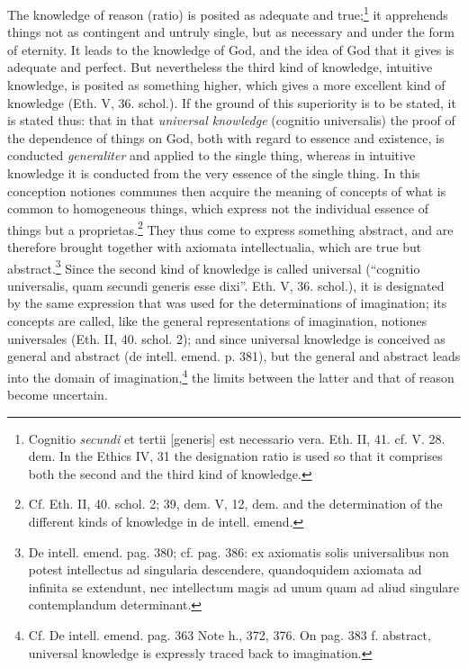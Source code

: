 \documentclass[12pt,a4paper,openany]{book}
\newcommand{\opage}[1]{\marginnote{\footnotesize\textit{[#1]}}}
\begin{document}
The knowledge of reason (ratio) is posited as adequate and
true;\footnote{Cognitio \emph{secundi} et tertii [generis] est
necessario vera. Eth. II, 41. cf. V. 28. dem. In the Ethics IV, 31
the designation ratio is used so that it comprises both the second
and the third kind of knowledge.} it apprehends things not as contingent
and untruly single, but as necessary and under the form of eternity. It
leads to the knowledge of God, and the idea of God that it gives is adequate and
perfect. But nevertheless the third
\opage{101}\setcounter{footnote}{0}kind of knowledge, intuitive knowledge, is posited as something higher, which
gives a more excellent kind of knowledge (Eth. V, 36. schol.). If
the ground of this superiority is to be stated, it is stated thus: that in
that \emph{universal knowledge} (cognitio universalis) the proof of
the dependence of things on God, both with regard to essence and
existence, is conducted \emph{generaliter} and applied to the single
thing, whereas in intuitive knowledge it is conducted from the very
essence of the single thing. In this conception notiones communes then acquire
the meaning of concepts of what is common to homogeneous things, which
express not the individual essence of things but a
proprietas.\footnote{Cf. Eth. II, 40. schol. 2; 39, dem. V, 12,
dem. and the determination of the different kinds of knowledge in de
intell. emend.} They thus come to express something abstract, and
are therefore brought together with axiomata intellectualia, which are true
but abstract.\footnote{De intell. emend. pag. 380; cf. pag. 386:
ex axiomatis solis universalibus non potest intellectus ad
singularia descendere, quandoquidem axiomata ad infinita se
extendunt, nec intellectum magis ad unum quam ad aliud singulare
contemplandum determinant.} Since the second kind of knowledge is called
universal (``cognitio universalis, quam secundi generis esse dixi''.
Eth. V, 36. schol.), it is designated by the same expression that was used
for the determinations of imagination; its concepts are called, like
the general representations of imagination, notiones universales
(Eth. II, 40. schol. 2); and since universal knowledge is
conceived as general and abstract (de intell. emend. p. 381), but the
general and abstract leads into the domain of
imagination,\footnote{Cf. De intell. emend. pag. 363 Note h., 372, 376.
On pag. 383 f. abstract, universal knowledge is
expressly traced back to imagination.} the limits between
the latter and that of reason become uncertain.
\end{document}
